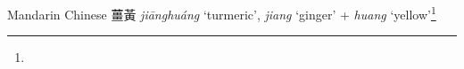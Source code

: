 \begin{etymology}\label{ety:jianghuang}
Mandarin Chinese {薑黃} \textit{jiānghuáng} `turmeric', \textit{jiang} `ginger' + \textit{huang} `yellow'\footnote{}
\end{etymology}